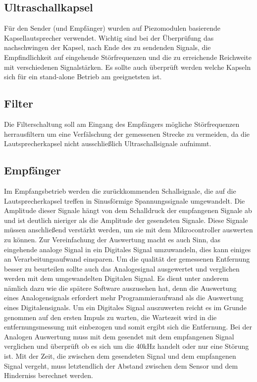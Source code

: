 \subsection{Ultraschallkapsel}
Für den Sender (und Empfänger) wurden auf Piezomodulen basierende Kapsellautsprecher verwendet.  Wichtig sind bei der Überprüfung das nachschwingen der Kapsel, nach Ende des zu sendenden Signals, die Empfindlichkeit auf eingehende Störfrequenzen und die zu erreichende Reichweite mit verschiedenen Signalstärken. Es sollte auch überprüft werden welche Kapseln sich für ein stand-alone Betrieb am geeignetsten ist.
\subsection{Filter}
Die Filterschaltung soll am Eingang des Empfängers mögliche Störfrequenzen herrausfiltern um eine Verfälschung der gemessenen Strecke zu vermeiden, da die Lautsprecherkapsel nicht ausschließlich Ultraschallsignale aufnimmt.

\subsection{Empfänger}
Im Empfangsbetrieb werden die zurückkommenden Schallsignale, die auf die Lautsprecherkapsel treffen in Sinusförmige Spannungssignale umgewandelt. Die Amplitude dieser Signale hängt von dem Schalldruck der empfangenen Signale ab und ist deutlich nieriger als die Amplitude der gesendeten Signale. Diese Signale müssen anschließend verstärkt werden, um sie mit dem Mikrocontroller auswerten zu können. Zur Vereinfachung der Auswertung macht es auch Sinn, das eingehende analoge Signal in ein Digitales Signal umzuwandeln, dies kann einiges an Verarbeitungsaufwand einsparen. Um die qualität der gemessenen Entfernung besser zu beurteilen sollte auch das Analogesignal ausgewertet und verglichen werden mit dem umgewandelten Digitalen Signal. Es dient unter anderem nämlich dazu wie die spätere Software auszusehen hat, denn die Auswertung eines Analogensignals erfordert mehr Programmieraufwand als die Auswertung eines Digitalensignals. Um ein Digitales Signal auszuwerten reicht es im Grunde genommen auf den ersten Impuls zu warten, die Wartezeit wird in die entfernungsmessung mit einbezogen und somit ergibt sich die Entfernung. Bei der Analogen Auswertung muss mit dem gesendet mit dem empfangenen Signal verglichen und überprüft ob es sich um die 40kHz handelt oder nur eine Störung ist.
Mit der Zeit, die zwischen dem gesendeten Signal und dem empfangenen Signal vergeht, muss letztendlich der Abstand zwischen dem Sensor und dem Hinderniss berechnet werden.
